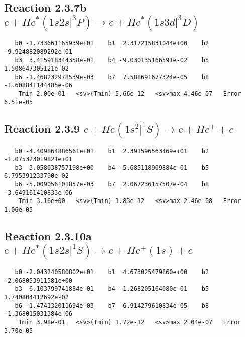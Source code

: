 \documentclass[12pt]{article}
\begin{document}
                               


\newpage
\subsection{
Reaction 2.3.7b $  e + He^*(1s2s|^3P) \rightarrow e + He^*(1s3d|^3D)$}


\begin{small}\begin{verbatim}
   b0 -1.733661165939e+01    b1  2.317215831044e+00    b2 -9.924882089292e-01
   b3  3.415918344358e-01    b4 -9.030135166591e-02    b5  1.508647305121e-02
   b6 -1.468232978539e-03    b7  7.588691677324e-05    b8 -1.608841144485e-06
    Tmin 2.00e-01   <sv>(Tmin) 5.66e-12   <sv>max 4.46e-07   Error 6.51e-05
\end{verbatim}\end{small}

\newpage
\subsection{
Reaction 2.3.9 $   e + He(1s^2|^1S) \rightarrow e + He^+ + e$}


\begin{small}\begin{verbatim}
   b0 -4.409864886561e+01    b1  2.391596563469e+01    b2 -1.075323019821e+01
   b3  3.058038757198e+00    b4 -5.685118909884e-01    b5  6.795391233790e-02
   b6 -5.009056101857e-03    b7  2.067236157507e-04    b8 -3.649161410833e-06
    Tmin 3.16e+00   <sv>(Tmin) 1.83e-12   <sv>max 2.46e-08   Error 1.06e-05
\end{verbatim}\end{small}

\newpage
\subsection{
Reaction 2.3.10a $ e + He^*(1s2s|^1S) \rightarrow e + He^+(1s) + e$}


\begin{small}\begin{verbatim}
   b0 -2.043240580802e+01    b1  4.673025479860e+00    b2 -2.068053911581e+00
   b3  6.103799741884e-01    b4 -1.268205164080e-01    b5  1.740804412692e-02
   b6 -1.474132011694e-03    b7  6.914279610834e-05    b8 -1.368015031384e-06
    Tmin 3.98e-01   <sv>(Tmin) 1.72e-12   <sv>max 2.04e-07   Error 3.70e-05
\end{verbatim}\end{small}
\end{document}
